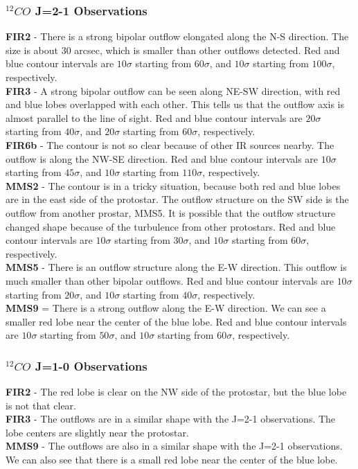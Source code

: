 \documentclass[twoside,11pt]{gshs_thesis}
\begin{document}
\subsubsection{$^{12}CO$ J=2-1 Observations}
\noindent\textbf{FIR2} - There is a strong bipolar outflow elongated along the N-S direction. The size is about 30 arcsec, which is smaller than other outflows detected. Red and blue contour intervals are $10\sigma$ starting from $60\sigma$, and $10\sigma$ starting from $100\sigma$, respectively.\\
\textbf{FIR3} - A strong bipolar outflow can be seen along NE-SW direction, with red and blue lobes overlapped with each other. This tells us that the outflow axis is almost parallel to the line of sight. Red and blue contour intervals are $20\sigma$ starting from $40\sigma$, and $20\sigma$ starting from $60\sigma$, respectively. \\
\textbf{FIR6b} - The contour is not so clear because of other IR sources nearby. The outflow is along the NW-SE direction. Red and blue contour intervals are $10\sigma$ starting from $45\sigma$, and $10\sigma$ starting from $110\sigma$, respectively.\\
\textbf{MMS2} - The contour is in a tricky situation, because both red and blue lobes are in the east side of the protostar. The outflow structure on the SW side is the outflow from another prostar, MMS5. It is possible that the outflow structure changed shape because of the turbulence from other protostars. Red and blue contour intervals are $10\sigma$ starting from $30\sigma$, and $10\sigma$ starting from $60\sigma$, respectively.\\
\textbf{MMS5} - There is an outflow structure along the E-W direction. This outflow is much smaller than other bipolar outflows. Red and blue contour intervals are $10\sigma$ starting from $20\sigma$, and $10\sigma$ starting from $40\sigma$, respectively.\\
\textbf{MMS9} = There is a strong outflow along the E-W direction. We can see a smaller red lobe near the center of the blue lobe. Red and blue contour intervals are $10\sigma$ starting from $50\sigma$, and $10\sigma$ starting from $60\sigma$, respectively.\\

\subsubsection{$^{12}CO$ J=1-0 Observations}
\textbf{FIR2} - The red lobe is clear on the NW side of the protostar, but the blue lobe is not that clear.\\
\textbf{FIR3} - The outflows are in a similar shape with the J=2-1 observations. The lobe centers are slightly near the protostar.\\
\textbf{MMS9} - The outflows are also in a similar shape with the J=2-1 observations. We can also see that there is a small red lobe near the center of the blue lobe.\\
\newpage
\end{document}
